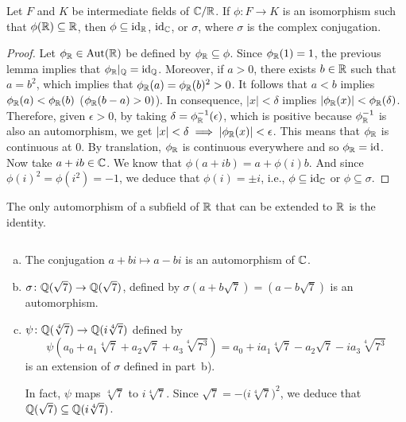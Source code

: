 \begin{thm}
    Let\/ $F$ and\/ $K$ be intermediate fields of\/ $\mathbb{C}/\mathbb{R}$. If\/ $\phi\colon F\to K$ is an isomorphism such that\/ $\phi(\mathbb{R})\subseteq\mathbb{R}$, then\/ $\phi\subseteq\operatorname{id}_{\mathbb{R}}$,\/ $\operatorname{id}_{\mathbb{C}}$, or\/ $\sigma$, where\/ $\sigma$ is the complex conjugation.
\end{thm}

\begin{proof}
    Let $\phi_{\mathbb{R}}\in{\rm Aut}(\mathbb{R})$ be defined by $\phi_{\mathbb{R}}\subseteq\phi$. Since $\phi_{\mathbb{R}}(1)=1$, the previous lemma implies that $\phi_{\mathbb{R}}|_{\mathbb{Q}}=\operatorname{id}_{\mathbb{Q}}$. Moreover, if $a>0$, there exists $b\in\mathbb{R}$ such that $a=b^2$, which implies that $\phi_{\mathbb{R}}(a)=\phi_{\mathbb{R}}(b)^2>0$. It follows that $a<b$ implies $\phi_{\mathbb{R}}(a)<\phi_{\mathbb{R}}(b)$ ($\phi_{\mathbb{R}}(b-a)>0)$). In consequence, $|x|<\delta$ implies $|\phi_{\mathbb{R}}(x)|<\phi_{\mathbb{R}}(\delta)$. Therefore, given $\epsilon>0$, by taking $\delta=\phi_{\mathbb{R}}^{-1}(\epsilon)$, which is positive because $\phi_{\mathbb{R}}^{-1}$ is also an automorphism, we get $|x|<\delta\implies|\phi_{\mathbb{R}}(x)|<\epsilon$. This means that $\phi_{\mathbb{R}}$ is continuous at $0$. By translation, $\phi_{\mathbb{R}}$ is continuous everywhere and so $\phi_{\mathbb{R}}=\operatorname{id}$. Now take $a+ib\in\mathbb{C}$. We know that $\phi(a+ib)=a+\phi(i)b$. And since $\phi(i)^2=\phi(i^2)=-1$, we deduce that $\phi(i)=\pm i$, i.e., $\phi\subseteq\operatorname{id}_{\mathbb{C}}$ or $\phi\subseteq\sigma$.
    
\end{proof}

\begin{cor}
    The only automorphism of a subfield of\/ $\mathbb{R}$ that can be extended to\/ $\mathbb{R}$ is the identity.
\end{cor}

\begin{xmpls}\label{xmpls:proto-wild-automorphisms}${}$
    \begin{enumerate}[a), font=\upshape]
        \item The conjugation $a+bi\mapsto a-bi$ is an automorphism of $\mathbb{C}$.

        \item $\sigma\colon\mathbb{Q}(\sqrt7)\to\mathbb{Q}(\sqrt7)$, defined by $\sigma(a+b\sqrt7)=(a-b\sqrt7)$ is an automorphism.

        \item $\psi\colon\mathbb{Q}(\sqrt[4]7)\to\mathbb{Q}(i\sqrt[4]7)$ defined by
        $$
            \psi(a_0+a_1\sqrt[4]7+a_2\sqrt7+a_3\sqrt[4]{7^3})
                = a_0 + ia_1\sqrt[4]7-a_2\sqrt7-ia_3\sqrt[4]{7^3}
        $$
        is an extension of $\sigma$ defined in part~b).

        In fact, $\psi$ maps $\sqrt[4]7$ to $i\sqrt[4]7$. Since $\sqrt7=-\big(i\sqrt[4]7\big)^2$, we deduce that $\mathbb{Q}(\sqrt7)\subseteq\mathbb{Q}(i\sqrt[4]7)$.
    \end{enumerate}
\end{xmpls}

